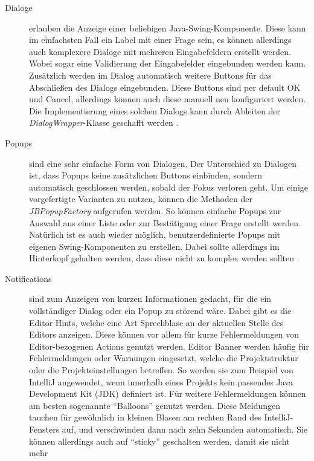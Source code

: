   \begin{description}
    \item[Dialoge] erlauben die Anzeige einer beliebigen Java-Swing-Komponente. 
      Diese kann im einfachsten Fall ein Label mit einer Frage sein, es können allerdings
      auch komplexere Dialoge mit mehreren Eingabefeldern erstellt werden. Wobei
      sogar eine Validierung der Eingabefelder eingebunden werden kann. Zusätzlich
      werden im Dialog automatisch weitere Buttons für das Abschließen des Dialogs 
      eingebunden. Diese Buttons sind per default OK und Cancel, allerdings können auch
      diese manuell neu konfiguriert werden. Die Implementierung eines solchen Dialogs
      kann durch Ableiten der \emph{DialogWrapper}-Klasse geschafft werden
      \cite{IntelliJPlatformSDKDialogs}.
    \item[Popups] sind eine sehr einfache Form von Dialogen. Der Unterschied zu Dialogen
      ist, dass Popups keine zusätzlichen Buttons einbinden, sondern automatisch 
      geschlossen werden, sobald der Fokus verloren geht. Um einige vorgefertigte 
      Varianten zu nutzen, können die Methoden der \emph{JBPopupFactory} aufgerufen werden.
      So können einfache Popups zur Auswahl aus einer Liste oder zur Bestätigung einer
      Frage erstellt werden. Natürlich ist es auch wieder möglich, benutzerdefinierte
      Popups mit eigenen Swing-Komponenten zu erstellen. Dabei sollte allerdings im
      Hinterkopf gehalten werden, dass diese nicht zu komplex werden sollten
      \cite{IntelliJPlatformSDKPopups}.
    \item[Notifications] sind zum Anzeigen von kurzen Informationen gedacht, für die
      ein vollständiger Dialog oder ein Popup zu störend wäre. Dabei gibt es die 
      Editor Hints, welche eine Art Sprechblase an der aktuellen Stelle des Editors
      anzeigen. Diese können vor allem für kurze Fehlermeldungen von Editor-bezogenen
      Actions genutzt werden. Editor Banner werden häufig für Fehlermeldungen 
      oder Warnungen eingesetzt, welche die Projektstruktur oder die 
      Projekteinstellungen betreffen. So werden sie zum Beispiel von IntelliJ angewendet, 
      wenn innerhalb eines Projekts kein passendes Java Development Kit (JDK) definiert ist. Für weitere
      Fehlermeldungen können am besten sogenannte \enquote{Balloons} genutzt werden.
      Diese Meldungen tauchen für gewöhnlich in kleinen Blasen am rechten Rand
      des IntelliJ-Fensters auf, und verschwinden dann nach zehn Sekunden automatisch.
      Sie können allerdings auch auf \enquote{sticky} geschalten werden, damit sie nicht mehr

\end{description}
